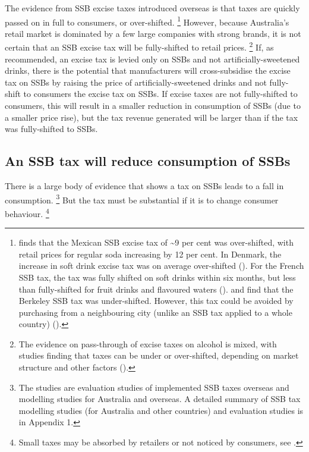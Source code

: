 \documentclass[embargoed]{grattan}
\begin{document}
The evidence from SSB excise taxes introduced overseas is that taxes are quickly passed on in full to consumers, or over-shifted.%
\footnote{\textcite{Grogger2015Sodataxesprices} finds that the Mexican SSB excise tax of \textasciitilde{}9 per cent was over-shifted, with retail prices for regular soda increasing by 12 per cent.
In Denmark, the increase in soft drink excise tax was on average over-shifted (\textcite{Bergman2010Areexcisetaxes}).
For the French SSB tax, the tax was fully shifted on soft drinks within six months, but less than fully-shifted for fruit drinks and flavoured waters (\textcites{Berardi2016impactsodataxon}{Bonnet2013Taxincidencestrategic}). \textcite{Cawley2015IncidenceTaxesSugar} and \textcite{Falbe2015Higherretailprices} find that the Berkeley SSB tax was under-shifted.
However, this tax could be avoided by purchasing from a neighbouring city (unlike an SSB tax applied to a whole country) (\textcite{Veerman2016ImpactTaxSugar}).} However, because Australia's retail market is dominated by a few large companies with strong brands, it is not certain that an SSB excise tax will be fully-shifted to retail prices.%
\footnote{The evidence on pass-through of excise taxes on alcohol is mixed, with studies finding that taxes can be under or over-shifted, depending on market structure and other factors (\textcites{Cawley2015economyscalesselective}{DeCicca2013Whopayscigarette}{Dube2004Multiplediscretenessproduct}).} If, as recommended, an excise tax is levied only on SSBs and not artificially-sweetened drinks, there is the potential that manufacturers will cross-subsidise the excise tax on SSBs by raising the price of artificially-sweetened drinks and not fully-shift to consumers the excise tax on SSBs.
If excise taxes are not fully-shifted to consumers, this will result in a smaller reduction in consumption of SSBs (due to a smaller price rise), but the tax revenue generated will be larger than if the tax was fully-shifted to SSBs.

\subsection{An SSB tax will reduce consumption of SSBs}\label{an-ssb-tax-will-reduce-consumption-of-ssbs}

There is a large body of evidence that shows a tax on SSBs leads to a fall in consumption.%
\footnote{The studies are evaluation studies of implemented SSB taxes overseas and modelling studies for Australia and overseas.
A detailed summary of SSB tax modelling studies (for Australia and other countries) and evaluation studies is in Appendix 1.} But the tax must be substantial if it is to change consumer behaviour.%
\footnote{Small taxes may be absorbed by retailers or not noticed by consumers, see \textcites{Thow2014systematicrevieweffectiveness}{Powell2013Assessingpotentialeffectiveness}{Mytton2012Taxingunhealthyfood}{Team2016Sugarlevyworking}{LordanShouldweput}{Organization2016FiscalPoliciesDiet}.}
\end{document}
